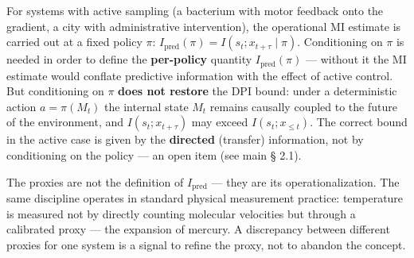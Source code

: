 \documentclass[pdflatex,sn-mathphys-ay]{sn-jnl}
\begin{document}
For systems with active sampling (a bacterium with motor feedback onto the gradient, a city with administrative intervention), the operational MI estimate is carried out at a fixed policy \(\pi\): \(I_{\text{pred}}(\pi) = I(s_t; x_{t+\tau} \mid \pi)\). Conditioning on \(\pi\) is needed in order to define the \textbf{per-policy} quantity \(I_{\text{pred}}(\pi)\) --- without it the MI estimate would conflate predictive information with the effect of active control. But conditioning on \(\pi\) \textbf{does not restore} the DPI bound: under a deterministic action \(a = \pi(M_t)\) the internal state \(M_t\) remains causally coupled to the future of the environment, and \(I(s_t; x_{t+\tau})\) may exceed \(I(s_t; x_{\le t})\). The correct bound in the active case is given by the \textbf{directed} (transfer) information, not by conditioning on the policy --- an open item (see main § 2.1).

The proxies are not the definition of \(I_{\text{pred}}\) --- they are its operationalization. The same discipline operates in standard physical measurement practice: temperature is measured not by directly counting molecular velocities but through a calibrated proxy --- the expansion of mercury. A discrepancy between different proxies for one system is a signal to refine the proxy, not to abandon the concept.
\end{document}
